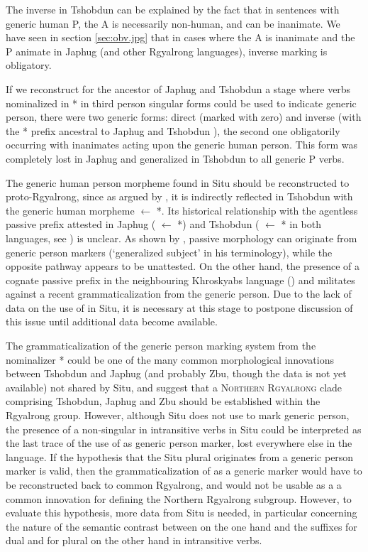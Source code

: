 The inverse   in Tshobdun can be explained by  the fact that in sentences with generic human P, the A is necessarily non-human, and can be inanimate. We have seen in section \ref{sec:obv.jpg} that in cases where the A is inanimate and the P animate in Japhug (and other Rgyalrong languages), inverse marking is obligatory. 


If we reconstruct for the ancestor of Japhug and Tshobdun a stage where verbs nominalized in * in third person singular forms could be used to indicate generic person, there were two generic forms: direct (marked with zero) and inverse (with the * prefix ancestral to Japhug  and Tshobdun ), the second one obligatorily occurring with inanimates acting upon the generic human person. This form was completely lost in Japhug and generalized in Tshobdun to all generic P verbs.

The generic human person morpheme  found in Situ should be reconstructed to proto-Rgyalrong, since as argued by  \citet[244]{sun14generic}, it is indirectly reflected in Tshobdun with the generic human morpheme  $\leftarrow$ *. Its historical relationship with the  agentless passive prefix attested in Japhug  ( $\leftarrow$ *) and Tshobdun ( $\leftarrow$ * in both languages, see \citealt{jacques12demotion}) is unclear. As shown by \citet[49-50]{haspelmath90passive}, passive morphology can originate from generic person markers (`generalized subject' in his terminology), while the opposite pathway appears to be unattested. On the other hand, the presence of a cognate passive prefix  in the neighbouring Khroskyabs language (\citealt[152-154]{lai13affixale}) and militates against a recent grammaticalization from the generic person. Due to the lack of data on the use of  in Situ, it is necessary at this stage to postpone discussion of this issue until additional data become available.


The grammaticalization of the generic person marking system from the nominalizer * could be one of the many common morphological innovations between Tshobdun and Japhug (and probably Zbu, though the data is not yet available) not shared by Situ, and suggest that a \textsc{Northern Rgyalrong} clade comprising Tshobdun, Japhug and Zbu should be established within the Rgyalrong group. However, although Situ does not use  to mark generic person,  the presence of a non-singular  in intransitive verbs in Situ could be interpreted as the last trace of the use of  as generic person marker, lost everywhere else in the language. If the hypothesis that the Situ plural originates from a generic person marker is valid, then the grammaticalization  of  as a generic marker would have to be reconstructed back to common Rgyalrong, and would not be usable as a a common innovation for defining the Northern Rgyalrong subgroup. However, to evaluate  this hypothesis, more data from Situ is needed, in particular concerning the nature of the semantic contrast between  on the one hand and the suffixes  for dual and  for plural on the other hand in intransitive verbs.


